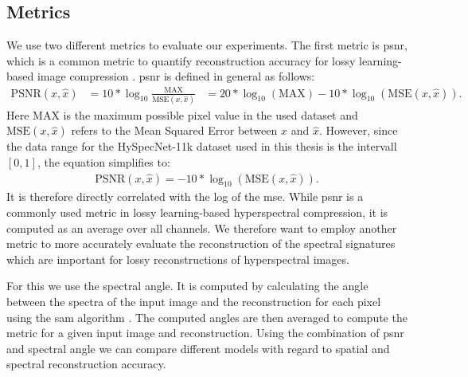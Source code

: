 \subsection{Metrics}
We use two different metrics to evaluate our experiments. The first metric is \ac{psnr}, which is a common metric to quantify reconstruction accuracy for lossy learning-based image compression \citep{balle_end--end_2017,balle_variational_2018,minnen_joint_2018,kuester_1d-convolutional_2021,kuester_transferability_2022,la_grassa_hyperspectral_2022}. \Ac{psnr}  is defined in general as follows:
\begin{align*}
\text{PSNR}(x,\hat{x}) &= 10*\log_{10}\frac{\text{MAX}}{\text{MSE}(x,\hat{x})}
&= 20 * \log_{10}(\text{MAX}) - 10*\log_{10}(\text{MSE}(x,\hat{x})).
\end{align*}
Here MAX is the maximum possible pixel value in the used dataset and $\text{MSE}(x,\hat{x})$ refers to the Mean Squared Error between $x$ and $\hat{x}$. However, since the data range for the HySpecNet-11k dataset used in this thesis is the intervall $[0,1]$, the equation simplifies to:
\begin{align*}
\text{PSNR}(x,\hat{x}) = - 10*\log_{10}(\text{MSE}(x,\hat{x})).
\end{align*}
It is therefore directly correlated with the log of the \ac{mse}.
While \ac{psnr} is a commonly used metric in lossy learning-based hyperspectral compression, it is computed as an average over all channels. We therefore want to employ another metric to more accurately evaluate the reconstruction of the spectral signatures which are important for lossy reconstructions of hyperspectral images.

For this we use the spectral angle. It is computed by calculating the angle between the spectra of the input image and the reconstruction for each pixel using the \ac{sam} algorithm \citep{kruse_spectral_1993}. The computed angles are then averaged to compute the metric for a given input image and reconstruction. Using the combination of \ac{psnr} and spectral angle we can compare different models with regard to spatial and spectral reconstruction accuracy.
